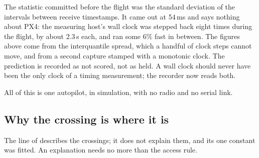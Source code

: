 \begin{remark}
The statistic committed before the flight was the standard deviation of the intervals between
receive timestamps. It came out at 54\,ms and says nothing about PX4: the measuring host's wall
clock was stepped back eight times during the flight, by about 2.3\,s each, and ran some 6\%
fast in between. The figures above come from the interquantile spread, which a handful of
clock steps cannot move, and from a second capture stamped with a monotonic clock. The
prediction is recorded as not scored, not as held. A wall clock should never have been the only
clock of a timing measurement; the recorder now reads both.

All of this is one autopilot, in simulation, with no radio and no serial link.
\end{remark}

\subsection{Why the crossing is where it is}\label{sec:why}

The line of  describes the crossings; it does not explain them, and its one
constant was fitted. An explanation needs no more than the access rule.

